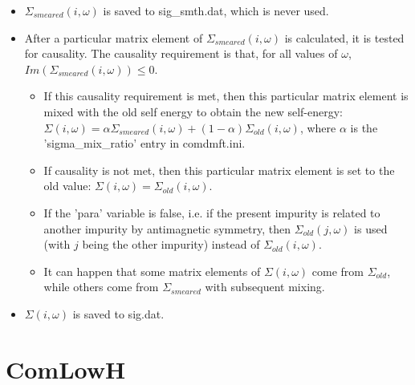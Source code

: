 \documentclass[aps,prb,singlecolumn,preprintnumbers,amsmath,amssymb]{revtex4}
\begin{document}
\begin{itemize}
\begin{itemize}
 \item $\Sigma_{smeared}(i,\omega) $  is saved to sig\_smth.dat, which is never used. 
 \item After a particular matrix element of $\Sigma_{smeared}(i,\omega) $ is calculated, it is tested for causality.  The causality requirement is that, for all values of $\omega$, $Im(\Sigma_{smeared}(i,\omega)) \leq 0 $. 
 \begin{itemize}
 \item If this causality requirement is met, then this particular matrix element is mixed with the old self energy to obtain the new self-energy: $\Sigma(i,\omega)  = \alpha \Sigma_{smeared}(i,\omega)  + (1-\alpha) \Sigma_{old}(i,\omega) $, where $\alpha$ is the 'sigma\_mix\_ratio' entry in comdmft.ini.
 \item If causality is not met, then this particular matrix element is set to the old value: $\Sigma(i,\omega)  =  \Sigma_{old}(i,\omega) $.
 \item If the 'para' variable is false, i.e. if the present impurity is related to another impurity by antimagnetic symmetry, then $\Sigma_{old}(j,\omega)$ is used (with $j$ being the other impurity) instead of $\Sigma_{old}(i,\omega)$.
 \item It can happen that some matrix elements of $\Sigma(i,\omega)$ come from $\Sigma_{old}$, while others come from $\Sigma_{smeared} $ with subsequent  mixing.
  \end{itemize}
  \item  $\Sigma(i,\omega)$ is saved to sig.dat.
 \end{itemize}

\end{itemize}


\section{ComLowH}
\end{document}

